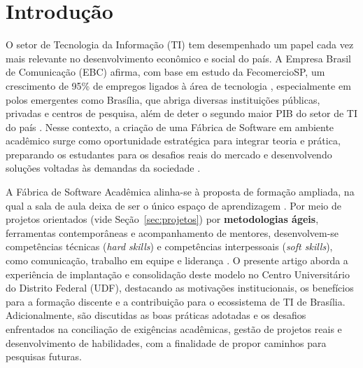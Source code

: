 \documentclass[
	12pt,           %
	openright,      %
	oneside,        %
	a4paper,        %
	brazil          %
]{abntex2}
\begin{document}
\tableofcontents*
\cleardoublepage

\textual

\chapter{Introdução}
\label{sec:introducao}

O setor de Tecnologia da Informação (TI) \cite{kerlla} tem desempenhado um papel cada vez mais relevante no desenvolvimento econômico e social do país. A Empresa Brasil de Comunicação (EBC) afirma, com base em estudo da FecomercioSP, um crescimento de 95\% de empregos ligados à área de tecnologia \cite{ebctecnologia2024}, especialmente em polos emergentes como Brasília, que abriga diversas instituições públicas, privadas e centros de pesquisa, além de deter o segundo maior PIB do setor de TI do país \cite{agenciapib2020}. Nesse contexto, a criação de uma Fábrica de Software em ambiente acadêmico surge como oportunidade estratégica para integrar teoria e prática, preparando os estudantes para os desafios reais do mercado e desenvolvendo soluções voltadas às demandas da sociedade \cite{bernardi2017learning}.

A Fábrica de Software Acadêmica alinha-se à proposta de formação ampliada, na qual a sala de aula deixa de ser o único espaço de aprendizagem \cite{santos2021experiencia}. Por meio de projetos orientados (vide Seção~\ref{sec:projetos}) por \textbf{metodologias ágeis}, ferramentas contemporâneas e acompanhamento de mentores, desenvolvem-se competências técnicas (\emph{hard skills}) e competências interpessoais (\emph{soft skills}), como comunicação, trabalho em equipe e liderança \cite{perides2021competencias}. O presente artigo aborda a experiência de implantação e consolidação deste modelo no Centro Universitário do Distrito Federal (UDF), destacando as motivações institucionais, os benefícios para a formação discente e a contribuição para o ecossistema de TI de Brasília. Adicionalmente, são discutidas as boas práticas adotadas e os desafios enfrentados na conciliação de exigências acadêmicas, gestão de projetos reais e desenvolvimento de habilidades, com a finalidade de propor caminhos para pesquisas futuras.
\end{document}
